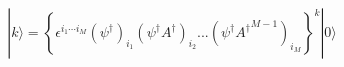 \begin{equation}
|k\rangle =
\left\{
\epsilon^{i_1\cdots i_M}(\psi^{\dag})_{i_1}
(\psi^{\dag} A^{\dag})_{i_2}
...(\psi^{\dag} {A^{\dag}}^{M-1})_{i_M}
\right\}^k
|0\rangle
\end{equation}

